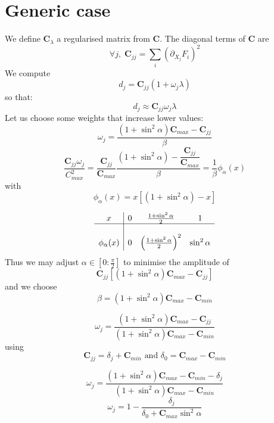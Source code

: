 \documentclass[aps,12pt]{revtex4}
\begin{document}
\section{Generic case}
We define $\bm{C}_\lambda$ a regularised matrix from $\bm{C}$.
The diagonal terms of $\bm{C}$ are
\begin{equation}
	\forall j, \; \bm{C}_{jj} = \sum_i \left(\partial_{X_j} F_i\right)^2
\end{equation}
We compute
\begin{equation}
	d_j = \bm{C}_{jj} (1+\omega_j \lambda)
\end{equation}
so that:
\begin{equation}
	d_j \approx \bm{C}_{jj} \omega_j \lambda
\end{equation}
Let us choose some weights that increase lower values:
\begin{equation}
	\omega_j = \dfrac{ (1+\sin^2\alpha) \bm{C}_{max}- \bm{C}_{jj}}{\beta}
\end{equation}
\begin{equation}
	\dfrac{\bm{C}_{jj}\omega_j}{C_{max}^2} 
	= \dfrac{\bm{C}_{jj}}{\bm{C}_{max}}\dfrac{ (1+\sin^2\alpha) - \dfrac{\bm{C}_{jj}}{\bm{C}_{max}} }{\beta}
	= \dfrac{1}{\beta} \phi_\alpha(x)
\end{equation}
with
\begin{equation}
	\phi_\alpha(x) = x \left[  (1+\sin^2\alpha) - x \right]
\end{equation}

\begin{equation}
\begin{array}{c|ccc}
x & 0 & \frac{1+\sin^2\alpha}{2} & 1\\
\hline
\\
\phi_\alpha(x) & 0 &  \left(\frac{1+\sin^2\alpha}{2}\right)^2 & \sin^2\alpha\\
\end{array}
\end{equation}
Thus we may adjust $\alpha\in[0:\frac{\pi}{2}]$ to minimise the amplitude of 
\begin{equation}
\bm{C}_{jj}\left[(1+\sin^2\alpha) \bm{C}_{max}- \bm{C}_{jj}\right]
\end{equation}
 and we choose
 \begin{equation}
  \beta = (1+\sin^2\alpha) \bm{C}_{max}-\bm{C}_{min}
 \end{equation}
 
 \begin{equation}
 \omega_j  = \dfrac{ (1+\sin^2\alpha) \bm{C}_{max}- \bm{C}_{jj}}{ (1+\sin^2\alpha) \bm{C}_{max}- \bm{C}_{min}}
 \end{equation}
 using 
 \begin{equation}
 	\bm{C}_{jj}= \delta_j + \bm{C}_{min} \text{ and } \delta_0 = \bm{C}_{max}- \bm{C}_{min}
 \end{equation}
 
\begin{equation}
\omega_j  = \dfrac{ (1+\sin^2\alpha) \bm{C}_{max}- \bm{C}_{min}- \delta_j }{ (1+\sin^2\alpha) \bm{C}_{max}- \bm{C}_{min}}
\end{equation}
\begin{equation}
\omega_j  = 1 - \dfrac{ \delta_j }{  \delta_0 + \bm{C}_{max}\sin^2\alpha }
\end{equation}
\end{document}
